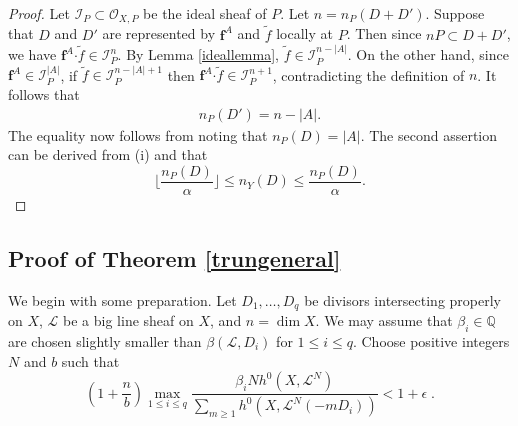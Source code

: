 \documentclass[10pt]{amsart}
\numberwithin{equation}{section}
\theoremstyle{plain}
\theoremstyle{definition}
\begin{document}
\begin{proof}
 Let ${\mathscr I}_P\subset \mathcal{O}_{ X, P}$ be the  ideal sheaf of $P$. Let $n=n_P(D+D')$. Suppose that $D$ and $D'$ are represented by $\mathbf{f}^A$ and ${\tilde f}$ locally at $P$. Then since $nP \subset D+D'$, we have $\mathbf{f}^A{\cdot\tilde f}\in {\mathscr I}_P^n$. By Lemma \ref{ideallemma}, ${\tilde f} \in {\mathscr I}_P^{n-| A|}$. On the other hand, since $\mathbf{f}^A \in {\mathscr I}_P^{|A|}$, if ${\tilde f}\in {\mathscr I}_P^{n-|A|+1}$ then  $\mathbf{f}^A{\cdot\tilde f}\in {\mathscr I}_P^{n+1}$, contradicting the definition of $n$. It follows that 
\begin{align*}
n_P(D')=n-|A|. 
\end{align*}
The equality now follows from noting that $n_P(D)=|A|$.
The second assertion can be derived from (i) and that 
$$
 \lfloor{\frac{n_P(D)}{\alpha}}\rfloor\le n_Y(D)\le  \frac{n_P(D)}{\alpha}.
$$
\end{proof}
 
\subsection{Proof of Theorem \ref{trungeneral}}
We begin with some preparation.
Let $D_1,\dots,D_q$ be divisors  intersecting properly on $X$, $\mathscr L$ be a big line sheaf on $X$, and
$n=\dim X$.   We may assume that $\beta_i\in \mathbb Q$ are chosen slightly smaller than $\beta( {\mathscr L}, D_{i})$ for $1\le i\le q$.
Choose positive integers $N$ and $b$ such that
\begin{equation}\label{aut_choices}
  \left( 1 + \frac nb \right) \max_{1\le i\le q}
      \frac{\beta_i Nh^0(X, \mathscr L^N) }
        {\sum_{m\ge1} h^0(X, \mathscr L^N(-mD_i))}
    < 1 + \epsilon\;.
\end{equation}
\end{document}

